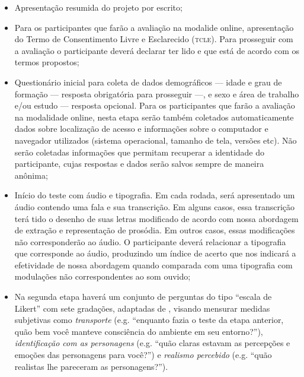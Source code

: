 \documentclass[a4paper,11pt,titlepage,singlespacing]{article}
\newcommand\todo[1]{\textcolor{red}{#1}}
\begin{document}
\begin{itemize}
    \item Apresentação resumida do projeto por escrito;
    \item Para os participantes que farão a avaliação na modalide online, apresentação do Termo de Consentimento Livre e Esclarecido (\textsc{tcle}). Para prosseguir com a avaliação o participante deverá declarar ter lido e que está de acordo com os termos propostos;
    \item Questionário inicial para coleta de dados demográficos — idade e grau de formação — resposta obrigatória para prosseguir —, e sexo e área de trabalho e/ou estudo — resposta opcional. Para os participantes que farão a avaliação na modalidade online, nesta etapa serão também coletados automaticamente dados sobre localização de acesso e informações sobre o computador e navegador utilizados (sistema operacional, tamanho de tela, versões etc). Não serão coletadas informações que permitam recuperar a identidade do participante, cujas respostas e dados serão salvos sempre de maneira anônima; 
    \item Início do teste com áudio e tipografia. Em cada rodada, será apresentado um áudio contendo uma fala e sua transcrição. Em alguns casos, essa transcrição terá tido o desenho de suas letras modificado de acordo com nossa abordagem de extração e representação de prosódia. Em outros casos, essas modificações não corresponderão ao áudio. O participante deverá relacionar a tipografia que corresponde ao áudio, produzindo um índice de acerto que nos indicará a efetividade de nossa abordagem quando comparada com uma tipografia com modulações não correspondentes ao som ouvido;
    \item Na segunda etapa haverá um conjunto de perguntas do tipo ``escala de Likert'' com sete gradações, adaptadas de , visando mensurar medidas subjetivas como \textit{transporte} (e.g. “enquanto fazia o teste da etapa anterior, quão bem você manteve consciência do ambiente em seu entorno?”), \textit{identificação com as personagens} (e.g. “quão claras estavam as percepções e emoções das personagens para você?”) e \textit{realismo percebido} (e.g. “quão realistas lhe pareceram as personagens?”). 
\end{itemize}

\end{document}
